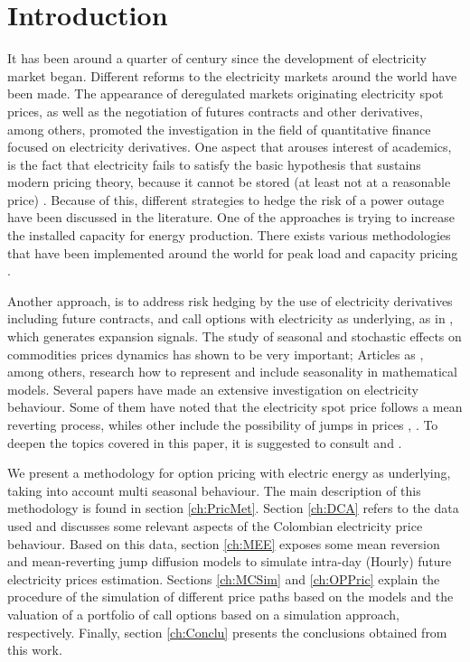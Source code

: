 \documentclass[3p]{elsarticle}
\begin{document}
\section{Introduction}\label{ch:Intro}
It has been around a quarter of century since the development of electricity market began. Different reforms to the electricity markets around the world have been made. The appearance of deregulated markets originating electricity spot prices, as well as the negotiation of futures contracts and other derivatives, among others, promoted the investigation in the field of quantitative finance focused on electricity derivatives. One aspect that arouses interest of academics, is the fact that electricity fails to satisfy the basic hypothesis that sustains modern pricing theory, because it cannot be stored (at least not at a reasonable price) \citep{Aid2015}. Because of this, different strategies to hedge the risk of a power outage have been discussed in the literature. One of the approaches is trying to increase the installed capacity for energy production. There exists various methodologies that have been implemented around the world for peak load and capacity pricing \citep{Harris2015}.

Another approach, is to address risk hedging by the use of electricity derivatives including future contracts, and call options with electricity as underlying, as in \citep{Barroso2006}, which generates expansion signals.
The study of seasonal and stochastic effects on commodities prices dynamics has shown to be very important;  Articles as \citep{Schwartz1997a},\cite{Borovkova2006} among others, research how to represent and include seasonality in mathematical models. Several papers have made an extensive investigation on electricity behaviour. Some of them have noted that the electricity spot price follows a mean reverting process\citep{Lucia2002a}, whiles other include the possibility of jumps in prices \citep{Cartea}, \citep{Escribano2011}. To deepen the topics covered in this paper, it is suggested to consult \citep{Aid2015} and \citep{Benth2014}.

We present a methodology for option pricing with electric energy as underlying, taking into account multi seasonal behaviour. The main description of this methodology is found in section \ref{ch:PricMet}. Section \ref{ch:DCA} refers to the data used and discusses some relevant aspects of the Colombian electricity price behaviour. Based on this data, section \ref{ch:MEE} exposes some mean reversion and mean-reverting jump diffusion models to simulate intra-day (Hourly) future electricity prices estimation. Sections \ref{ch:MCSim} and \ref{ch:OPPric} explain the procedure of the simulation of different price paths based on the models and the valuation of a portfolio of call options based on a simulation approach, respectively. Finally, section \ref{ch:Conclu} presents the conclusions obtained from this work.
\end{document}
